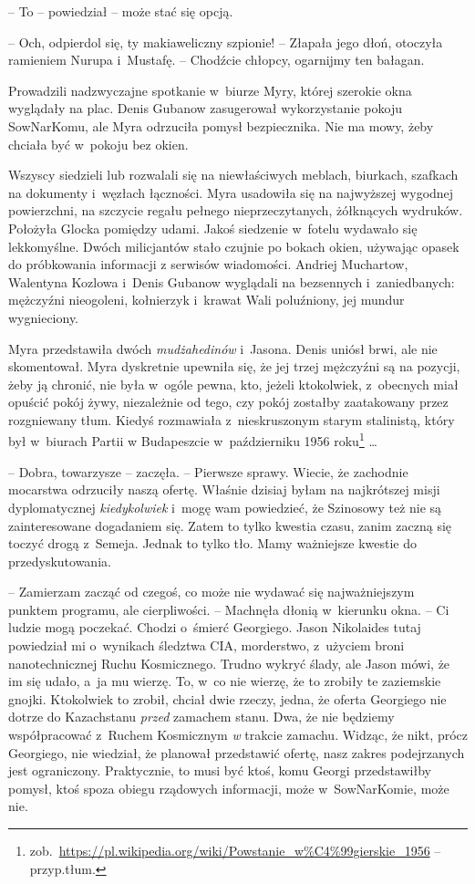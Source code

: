 \documentclass[oneside,polish,11pt,sfheadings]{mwbk}
\begin{document}
-- To -- powiedział -- może stać się opcją.

-- Och, odpierdol się, ty makiaweliczny szpionie! -- Złapała jego dłoń,
otoczyła ramieniem Nurupa i~Mustafę. -- Chodźcie chłopcy, ogarnijmy ten
bałagan.

Prowadzili nadzwyczajne spotkanie w~biurze Myry, której szerokie okna
wyglądały na plac. Denis Gubanow zasugerował wykorzystanie pokoju
SowNarKomu, ale Myra odrzuciła pomysł bezpiecznika. Nie ma mowy, żeby
chciała być w~pokoju bez okien.

Wszyscy siedzieli lub rozwalali się na niewłaściwych meblach, biurkach,
szafkach na dokumenty i~węzłach łączności. Myra usadowiła się na
najwyższej wygodnej powierzchni, na szczycie regału pełnego
nieprzeczytanych, żółknących wydruków. Położyła Glocka pomiędzy udami.
Jakoś siedzenie w~fotelu wydawało się lekkomyślne. Dwóch milicjantów
stało czujnie po bokach okien, używając opasek do próbkowania informacji
z serwisów wiadomości. Andriej Muchartow, Walentyna Kozlowa i~Denis
Gubanow wyglądali na bezsennych i~zaniedbanych: mężczyźni nieogoleni,
kołnierzyk i~krawat Wali poluźniony, jej mundur wygnieciony.

Myra przedstawiła dwóch \textit{mudżahedinów} i~Jasona. Denis uniósł brwi,
ale nie skomentował. Myra dyskretnie upewniła się, że jej trzej
mężczyźni są na pozycji, żeby ją chronić, nie była w~ogóle pewna, kto,
jeżeli ktokolwiek, z~obecnych miał opuścić pokój żywy, niezależnie od
tego, czy pokój zostałby zaatakowany przez rozgniewany tłum. Kiedyś
rozmawiała z~nieskruszonym starym stalinistą, który był w~biurach Partii
w Budapeszcie w~październiku 1956 roku\footnote{
zob.~\url{https://pl.wikipedia.org/wiki/Powstanie\_w\%C4\%99gierskie\_1956}
-- przyp.tłum.} \ldots

-- Dobra, towarzysze -- zaczęła. -- Pierwsze sprawy. Wiecie, że zachodnie
mocarstwa odrzuciły naszą ofertę. Właśnie dzisiaj byłam na najkrótszej
misji dyplomatycznej \textit{kiedykolwiek} i~mogę wam powiedzieć, że
Szinosowy też nie są zainteresowane dogadaniem się. Zatem to tylko
kwestia czasu, zanim zaczną się toczyć drogą z~Semeja. Jednak to tylko
tło. Mamy ważniejsze kwestie do przedyskutowania.

-- Zamierzam zacząć od czegoś, co może nie wydawać się najważniejszym
punktem programu, ale cierpliwości. -- Machnęła dłonią w~kierunku okna. -- Ci ludzie mogą poczekać. Chodzi o~śmierć Georgiego. Jason Nikolaides
tutaj powiedział mi o~wynikach śledztwa CIA, morderstwo, z~użyciem broni
nanotechnicznej Ruchu Kosmicznego. Trudno wykryć ślady, ale Jason mówi,
że im się udało, a~ja mu wierzę. To, w~co nie wierzę, że to zrobiły te
zaziemskie gnojki. Ktokolwiek to zrobił, chciał dwie rzeczy, jedna, że
oferta Georgiego nie dotrze do Kazachstanu \textit{przed} zamachem stanu.
Dwa, że nie będziemy współpracować z~Ruchem Kosmicznym \textit{w} trakcie
zamachu. Widząc, że nikt, prócz Georgiego, nie wiedział, że planował
przedstawić ofertę, nasz zakres podejrzanych jest ograniczony.
Praktycznie, to musi być ktoś, komu Georgi przedstawiłby pomysł, ktoś
spoza obiegu rządowych informacji, może w~SowNarKomie, może nie.
\end{document}
